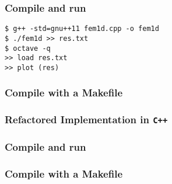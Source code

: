 \documentclass[smaller,a4paper]{beamer}
\begin{document}
\begin{frame}[fragile]
\frametitle{Compile and run}
\begin{verbatim}
$ g++ -std=gnu++11 fem1d.cpp -o fem1d
$ ./fem1d >> res.txt
$ octave -q
>> load res.txt
>> plot (res)
\end{verbatim}
\end{frame}

\begin{frame}
\frametitle{Compile with a Makefile}

\end{frame}


\begin{frame}[fragile]
\frametitle{Refactored Implementation in {\tt C++}}
\tiny
{}


\end{frame}

\begin{frame}[fragile]
\frametitle{Compile and run}

\end{frame}

\begin{frame}
\frametitle{Compile with a Makefile}

\end{frame}
\end{document}
